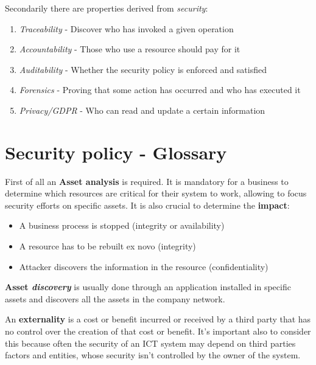 Secondarily there are properties derived from \textit{security}:
\begin{enumerate}
    \item \textit{Traceability} - Discover who has invoked a given operation
    \item \textit{Accountability} - Those who use a resource should pay for it
    \item \textit{Auditability} - Whether the security policy is enforced and satisfied
    \item \textit{Forensics} - Proving that some action has occurred and who has executed it
    \item \textit{Privacy/GDPR} - Who can read and update a certain information
\end{enumerate}



\section{Security policy - Glossary}
First of all an \textbf{Asset analysis} is required.
It is mandatory for a business to determine which resources are critical for their system to work,
allowing to focus security efforts on specific assets.\nl
It is also crucial to determine the \textbf{impact}:
\begin{itemize}
    \item A business process is stopped (integrity or availability)
    \item A resource has to be rebuilt ex novo (integrity)
    \item Attacker discovers the information in the resource (confidentiality)
\end{itemize}

\textbf{Asset \textit{discovery}} is usually done through an application installed in specific assets and discovers all the assets in the company network.\nl

An \textbf{externality} is a cost or benefit incurred or received by a third party that has no control over the creation of that cost or benefit.
It's important also to consider this because often the security of an ICT system may depend on third parties factors and entities,
whose security isn't controlled by the owner of the system.\nl

